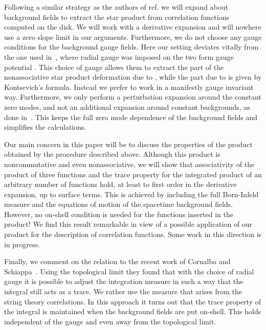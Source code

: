 \documentclass[a4paper,12pt]{article}
\begin{document}
Following a similar strategy as the authors of ref. \cite{Cornalba:2001sm}
we will expand about background fields to
extract %
the star product from correlation 
functions computed on the disk. We will work with a derivative expansion 
and will nowhere use a zero slope limit in our arguments.
Furthermore, we do not choose any gauge conditions for the 
background gauge fields. Here our setting deviates vitally from the one 
used in~\cite{Cornalba:2001sm}, where radial gauge was imposed on the two 
form gauge potential \coordHE{}. %
This choice of gauge allows them to extract the
part of the nonassociative star product deformation due to 
\coordHE{}, while the part due to \coordHE{} is given by Kontsevich's formula. 
Instead we prefer to work in a manifestly gauge invariant way. 
Furthermore, we only perform a perturbation expansion around 
the constant zero modes, and not an additional expansion around constant 
backgrounds, as done in~\cite{Cornalba:2001sm}. This keeps the full zero 
mode dependence of the background fields and simplifies the calculations.

Our main concern in this paper will be to discuss the 
properties of the product obtained by the procedure described above. 
Although this product is noncommutative and even nonassociative, we will 
show that associativity of the product of three functions and the trace
property for the integrated product of an arbitrary number of functions
hold, at least to first order in the derivative expansion,
up to surface 
terms. This is achieved by including the full Born-Infeld measure and  
the equations of motion of the spacetime background fields. However, 
no on-shell condition is needed for the functions inserted in the product! 
We find this result remarkable in view of a possible application of our
product for the description of correlation functions. Some work in this 
direction is in progress. 

Finally, we comment on the relation to the recent work of Cornalba and
Schiappa~\cite{Cornalba:2001sm}. Using the topological limit 
\coordHE{} 
they found that with the choice of radial gauge it is possible to adjust the 
integration measure in such a way that the integral still acts as a trace.
We rather use the measure that arises from the string theory correlations.
In this approach it turns out that the trace property of the integral is 
maintained when the background fields are put on-shell. This holds independent
of the gauge and even away from the topological limit.
\end{document}
